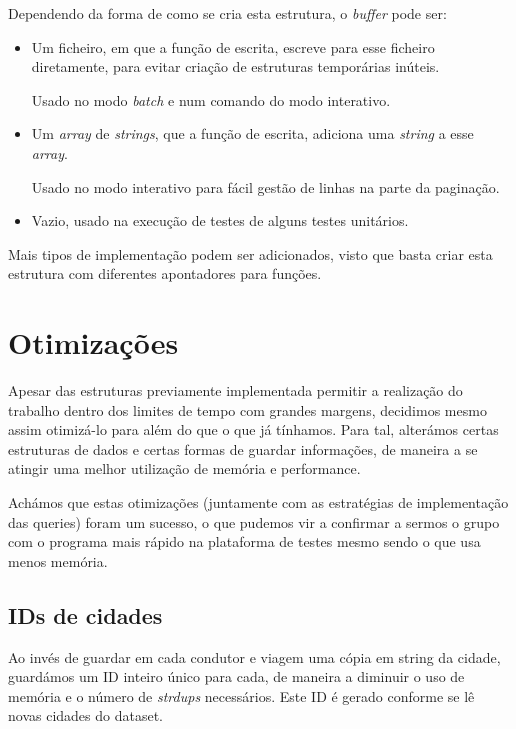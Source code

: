 \documentclass{article}
\begin{document}
            Dependendo da forma de como se cria esta estrutura, o \textit{buffer} pode ser:
            \begin{itemize}
                \item Um ficheiro, em que a função de escrita, escreve para esse ficheiro diretamente, para
                evitar criação de estruturas temporárias inúteis. 
                
                Usado no modo \textit{batch} e num comando do modo interativo.
                \item Um \textit{array} de \textit{strings}, que a função de escrita, adiciona uma \textit{string} a esse \textit{array}.

                Usado no modo interativo para fácil gestão de linhas na parte da paginação.
                \item Vazio, usado na execução de testes de alguns testes unitários.
            \end{itemize}
            Mais tipos de implementação podem ser adicionados, visto que basta criar esta
            estrutura com diferentes apontadores para funções.

    \section{Otimizações}
        Apesar das estruturas previamente implementada permitir a realização
        do trabalho dentro dos limites de tempo com grandes margens, decidimos
        mesmo assim otimizá-lo para além do que o que já tínhamos. Para tal, alterámos 
        certas estruturas de dados e certas formas de guardar informações, de 
        maneira a se atingir uma melhor utilização de memória e performance.
        
        Achámos que estas otimizações (juntamente com as estratégias de implementação das queries)
        foram um sucesso, o que pudemos vir a confirmar a sermos o grupo com o programa mais rápido 
        na plataforma de testes mesmo sendo o que usa menos memória.
        \subsection{IDs de cidades}
            Ao invés de guardar em cada condutor e viagem uma cópia em string da cidade,
            guardámos um ID inteiro único para cada, de maneira a diminuir o uso de memória e o número de \emph{strdups} necessários.
            Este ID é gerado conforme se lê novas cidades do dataset.
            
\end{document}
